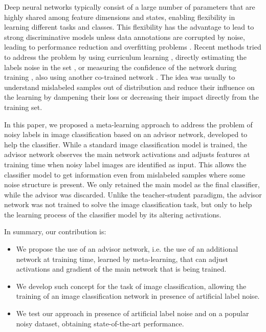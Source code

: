 \documentclass[runningheads]{llncs}
\begin{document}
	Deep neural networks typically consist of a large number of parameters that are highly shared among feature dimensions and states, enabling flexibility in learning different tasks and classes. This flexibility has the advantage to lead to strong discriminative models unless data annotations are corrupted by noise, leading to performance reduction and overfitting problems \cite{jiang2020beyond}. Recent methods tried to address the problem by using curriculum learning \cite{bengio2009curriculum}, directly estimating the labels noise in the set \cite{hendrycks2018using}, or measuring the confidence of the network during training \cite{kumar2010self}, also using another co-trained network \cite{han2018co}. The idea was usually to understand mislabeled samples out of distribution and reduce their influence on the learning by dampening their loss or decreasing their impact directly from the training set.
	
	In this paper, we proposed a meta-learning approach to address the problem of noisy labels in image classification based on an advisor network, developed to help the classifier. While a standard image classification model is trained, the advisor network observes the main network activations and adjusts features at training time when noisy label images are identified as input. This allows the classifier model to get information even from mislabeled samples where some noise structure is present. We only retained the main model as the final classifier, while the advisor was discarded. Unlike the teacher-student paradigm, the advisor network was not trained to solve the image classification task, but only to help the learning process of the classifier model by its altering activations.   
	
	In summary, our contribution is:
	\begin{itemize}
		\item We propose the use of an advisor network, i.e. the use of an additional network at training time, learned by meta-learning, that can adjust activations and gradient of the main network that is being trained.
		\item We develop such concept for the task of image classification, allowing the training of an image classification network in presence of artificial label noise.
		\item We test our approach in presence of artificial label noise and on a popular noisy dataset, obtaining state-of-the-art performance.  
	\end{itemize}
	
\end{document}
